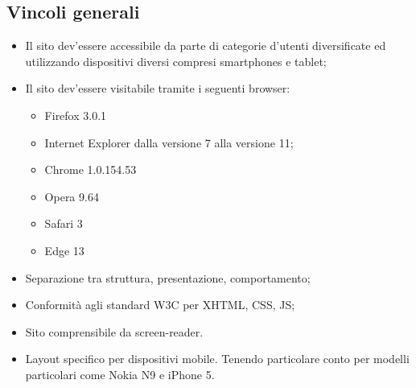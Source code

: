 {	\subsection{Vincoli generali}{
		\begin{itemize}\itemsep1pt
			\item Il sito dev'essere accessibile da parte di categorie d'utenti diversificate ed utilizzando dispositivi diversi compresi smartphones e tablet;
			\item Il sito dev'essere visitabile tramite i seguenti browser: 
				\begin{itemize}
					\item Firefox 3.0.1
					\item Internet Explorer dalla versione 7 alla versione 11; 
					\item Chrome 1.0.154.53
					\item Opera 9.64
					\item Safari 3
					\item Edge 13
				\end{itemize}
			\item Separazione tra struttura, presentazione, comportamento;
			\item Conformità agli standard W3C per XHTML, CSS, JS;
			\item Sito comprensibile da screen-reader.
			\item Layout specifico per dispositivi mobile. Tenendo particolare conto per modelli particolari come Nokia N9 e iPhone 5.
		\end{itemize}
	}
}
